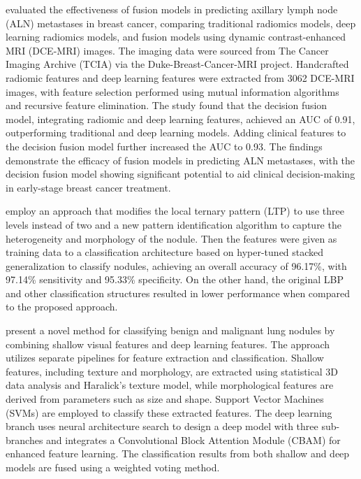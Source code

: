 \citet{XueLi2022} evaluated the effectiveness of fusion models in predicting axillary lymph node (ALN) metastases in breast cancer, comparing traditional radiomics models, deep learning radiomics models, and fusion models using dynamic contrast-enhanced MRI (DCE-MRI) images. The imaging data were sourced from The Cancer Imaging Archive (TCIA) via the Duke-Breast-Cancer-MRI project. Handcrafted radiomic features and deep learning features were extracted from 3062 DCE-MRI images, with feature selection performed using mutual information algorithms and recursive feature elimination. The study found that the decision fusion model, integrating radiomic and deep learning features, achieved an AUC of 0.91, outperforming traditional and deep learning models. Adding clinical features to the decision fusion model further increased the AUC to 0.93. The findings demonstrate the efficacy of fusion models in predicting ALN metastases, with the decision fusion model showing significant potential to aid clinical decision-making in early-stage breast cancer treatment.

\citet{Alksas2023} employ an approach that modifies the local ternary pattern (LTP) to use three levels instead of two and a new pattern identification algorithm to capture the heterogeneity and morphology of the nodule. Then the features were given as training data to a classification architecture based on hyper-tuned stacked generalization to classify nodules, achieving an overall accuracy of 96.17\%, with 97.14\% sensitivity and 95.33\% specificity. On the other hand, the original LBP and other classification structures resulted in lower performance when compared to the proposed approach.

\citet{Liu2023} present a novel method for classifying benign and malignant lung nodules by combining shallow visual features and deep learning features. The approach utilizes separate pipelines for feature extraction and classification. Shallow features, including texture and morphology, are extracted using statistical 3D data analysis and Haralick's texture model, while morphological features are derived from parameters such as size and shape. Support Vector Machines (SVMs) are employed to classify these extracted features. The deep learning branch uses neural architecture search to design a deep model with three sub-branches and integrates a Convolutional Block Attention Module (CBAM) for enhanced feature learning. The classification results from both shallow and deep models are fused using a weighted voting method.

